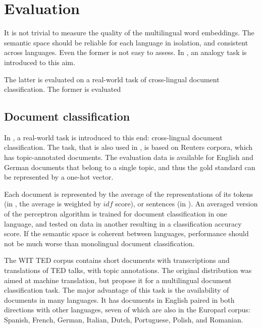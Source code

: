 

\section{Evaluation}

It is not trivial to measure the quality of the multilingual word embeddings. The semantic space should be reliable for each language in isolation, and consistent across languages. 
Even the former is not easy to assess. In \cite{mikolov2013efficient}, an analogy task is introduced to this aim.

The latter is evaluated on a real-world task of cross-lingual document classification. The former is evaluated




\subsection{Document classification}
In \cite{klementiev2012inducing}, a real-world task is introduced to this end: cross-lingual document classification. The task, that is also used in \cite{hermann2013multilingual}, is based on Reuters corpora, which has topic-annotated documents. The evaluation data is available for English and German documents that belong to a single topic, and thus the gold standard can be represented by a one-hot vector.

Each document is represented by the average of the representations of its tokens (in \cite{klementiev2012inducing}, the average is weighted by $idf$ score), or sentences (in \cite{hermann2013multilingual}).
An averaged version of the perceptron algorithm is trained for document classification in one language, and tested on data in another resulting in a classification accuracy score. If the semantic space is coherent between languages, performance should not be much worse than monolingual document classification.






The WIT TED corpus \cite{cettolo2012} contains short documents with transcriptions and translations of TED talks, with topic annotations. The original distribution was aimed at machine translation, but \cite{hermann2014multilingual} propose it for a multilingual document classification task. The major advantage of this task is the availability of documents in many languages. It has documents in English paired in both directions with other languages, seven of which are also in the Europarl corpus: Spanish, French, German, Italian, Dutch, Portuguese, Polish, and Romanian.

